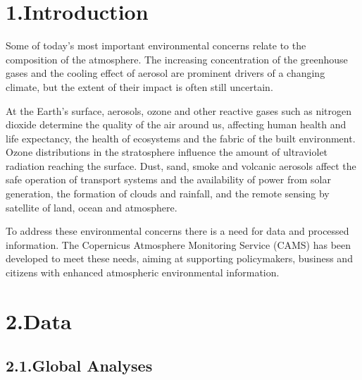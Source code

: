 \documentclass[9pt]{report}
\begin{document}
\mdxtitleblockstart{}
\mdxauthorstart{}
\mdxauthorend\mdtitleauthorrunning{}{}\mdxtitleblockend%

\section{1.\hspace*{0.5em}Introduction}\label{sec-introduction}%

\noindent{}Some of today’s most important environmental concerns relate to the 
composition of the atmosphere. The increasing concentration of the 
greenhouse gases and the cooling effect of aerosol are prominent 
drivers of a changing climate, but the extent of their impact is 
often still uncertain.%

At the Earth’s surface, aerosols, ozone and other reactive gases such as 
nitrogen dioxide determine the quality of the air around us, affecting 
human health and life expectancy, the health of ecosystems and the 
fabric of the built environment. Ozone distributions in the stratosphere 
influence the amount of ultraviolet radiation reaching the surface. 
Dust, sand, smoke and volcanic aerosols affect the safe operation of 
transport systems and the availability of power from solar generation, 
the formation of clouds and rainfall, and the remote sensing by satellite 
of land, ocean and atmosphere.%

To address these environmental concerns there is a need for data and 
processed information. The Copernicus Atmosphere Monitoring Service (CAMS) 
has been developed to meet these needs, aiming at supporting policymakers, 
business and citizens with enhanced atmospheric environmental information.%

\section{2.\hspace*{0.5em}Data}\label{sec-data}%

\subsection{2.1.\hspace*{0.5em}Global Analyses}\label{sec-global-analyses}%
\end{document}
